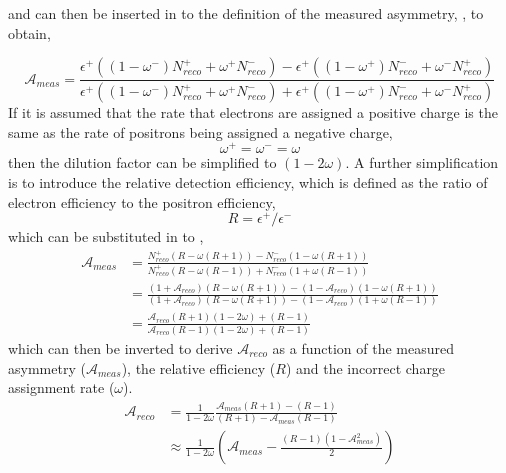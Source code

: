  and  can then be inserted in to the
definition of the measured asymmetry, , to obtain,

\begin{equation}
\label{eq:meas1}
\mathcal{A}_{meas} = \frac{
  \epsilon^+ ( ( 1 - \omega^- ) N_{reco}^{+} + \omega^+ N_{reco}^{-} ) -
  \epsilon^+ ( ( 1 - \omega^+ ) N_{reco}^{-} + \omega^- N_{reco}^{+} )
}
{
  \epsilon^+ ( ( 1 - \omega^- ) N_{reco}^{+} + \omega^+ N_{reco}^{-} ) +
  \epsilon^+ ( ( 1 - \omega^+ ) N_{reco}^{-} + \omega^- N_{reco}^{+} )
}
\end{equation}
If it is assumed that the rate that
electrons are assigned a positive charge is the same as the rate of positrons
being assigned a negative charge, \ie 
\begin{equation}
  \omega^{+} = \omega^{-} = \omega
\end{equation}
then the dilution factor can be simplified to $(1-2\omega)$. A further
simplification is to introduce the relative detection efficiency, which is
defined as the ratio of electron efficiency to the positron efficiency,
\begin{equation}
 R = \epsilon^+/\epsilon^-
\end{equation}
which can be substituted in to ,
\begin{align}
\mathcal{A}_{meas} 
&= \frac{
  N_{reco}^{+} (R - \omega(R+1)) -
  N_{reco}^{-} (1 - \omega(R+1))
}
{
  N_{reco}^{+} (R - \omega(R-1)) +
  N_{reco}^{-} (1 + \omega(R-1))
}\\
&= \frac{
  (1+\mathcal{A}_{reco}) (R - \omega(R+1)) -
  (1-\mathcal{A}_{reco}) (1 - \omega(R+1))
}
{
  (1+\mathcal{A}_{reco}) (R - \omega(R+1)) -
  (1-\mathcal{A}_{reco}) (1 + \omega(R-1))
}\\
&= \frac{
  \mathcal{A}_{reco} (R + 1)(1 - 2 \omega) + (R - 1)
}
{
  \mathcal{A}_{reco} (R - 1)(1 - 2 \omega) + (R - 1)
}
\end{align}
which can then be inverted to derive $\mathcal{A}_{reco}$ as a function of the
measured asymmetry ($\mathcal{A}_{meas}$), the relative efficiency ($R$) and the
incorrect charge assignment rate ($\omega$).
\begin{align}
\mathcal{A}_{reco}
&=\frac{1}{1-2\omega}
  \frac{
    \mathcal{A}_{meas} (R + 1) - (R-1)
  }
  {
    (R + 1) - \mathcal{A}_{meas} (R-1)
  }\\
&\approx \frac{1}{1-2\omega}
\left(
  \mathcal{A}_{meas} -
\frac{ (R - 1)(1 - \mathcal{A}_{meas}^{2}) } { 2 }
\right)
\end{align}

